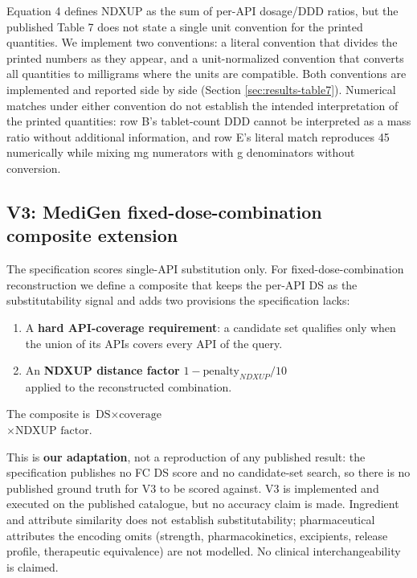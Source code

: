 \documentclass[a4paper]{elsarticle}
\begin{document}
Equation 4 defines NDXUP as the sum of per-API dosage/DDD ratios, but the published Table 7 does not state a single unit convention for the printed quantities. We implement two conventions: a literal convention that divides the printed numbers as they appear, and a unit-normalized convention that converts all quantities to milligrams where the units are compatible. Both conventions are implemented and reported side by side (Section \ref{sec:results-table7}). Numerical matches under either convention do not establish the intended interpretation of the printed quantities: row B's tablet-count DDD cannot be interpreted as a mass ratio without additional information, and row E's literal match reproduces 45 numerically while mixing mg numerators with g denominators without conversion.

\subsection{V3: MediGen fixed-dose-combination composite extension}
\label{sec:v3}

The specification scores single-API substitution only. For fixed-dose-combination reconstruction we define a composite that keeps the per-API DS as the substitutability signal and adds two provisions the specification lacks:

\begin{enumerate}
\item A \textbf{hard API-coverage requirement}: a candidate set qualifies only when the union of its APIs covers every API of the query.
\item An \textbf{NDXUP distance factor} $1 - \text{penalty}_{NDXUP}/10$ \\
applied to the reconstructed combination.
\end{enumerate}

The composite is $\text{DS} \times \text{coverage}$ \\
$\times \text{NDXUP factor}$.

This is \textbf{our adaptation}, not a reproduction of any published result: the specification publishes no FC DS score and no candidate-set search, so there is no published ground truth for V3 to be scored against. V3 is implemented and executed on the published catalogue, but no accuracy claim is made. Ingredient and attribute similarity does not establish substitutability; pharmaceutical attributes the encoding omits (strength, pharmacokinetics, excipients, release profile, therapeutic equivalence) are not modelled. No clinical interchangeability is claimed.
\end{document}
